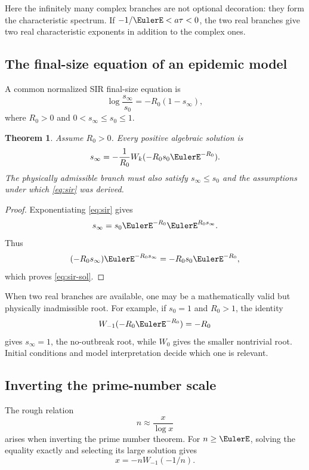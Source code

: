 \documentclass[11pt]{article}
\newtheorem{theorem}{Theorem}[section]
\theoremstyle{remark}
\begin{document}
Here the infinitely many complex branches are not optional decoration:
they form the characteristic spectrum.  If
\(-1/\EulerE<a\tau<0\), the two real branches give two real characteristic
exponents in addition to the complex ones.

\subsection{The final-size equation of an epidemic model}

A common normalized SIR final-size equation is
\begin{equation}\label{eq:sir}
       \log\frac{s_\infty}{s_0}
       =-R_0(1-s_\infty),
\end{equation}
where \(R_0>0\) and \(0<s_\infty\leq s_0\leq1\).

\begin{theorem}\label{thm:sir}
Assume \(R_0>0\).  Every positive algebraic solution is
\begin{equation}\label{eq:sir-sol}
       s_\infty
       =-\frac1{R_0}
       W_k(-R_0s_0\EulerE^{-R_0}).
\end{equation}
The physically admissible branch must also satisfy
\(s_\infty\leq s_0\) and the assumptions under which
\eqref{eq:sir} was derived.
\end{theorem}

\begin{proof}
Exponentiating \eqref{eq:sir} gives
\[
       s_\infty=s_0\EulerE^{-R_0}\EulerE^{R_0s_\infty}.
\]
Thus
\[
 (-R_0s_\infty)\EulerE^{-R_0s_\infty}
 =-R_0s_0\EulerE^{-R_0},
\]
which proves \eqref{eq:sir-sol}.
\end{proof}

When two real branches are available, one may be a mathematically valid but
physically inadmissible root.  For example, if \(s_0=1\) and \(R_0>1\),
the identity
\[
       W_{-1}(-R_0\EulerE^{-R_0})=-R_0
\]
gives \(s_\infty=1\), the no-outbreak root, while \(W_0\) gives the smaller
nontrivial root.  Initial conditions and model interpretation decide which
one is relevant.

\subsection{Inverting the prime-number scale}

The rough relation
\[
       n\approx\frac{x}{\log x}
\]
arises when inverting the prime number theorem.  For \(n\geq\EulerE\), solving
the equality exactly and selecting its large solution gives
\begin{equation}\label{eq:primeinverse}
       x=-nW_{-1}(-1/n).
\end{equation}
\end{document}
